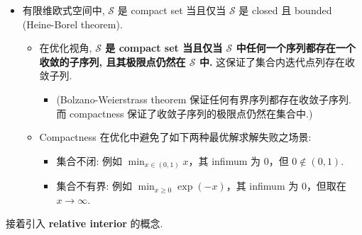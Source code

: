 \begin{itemize}
\item {}有限维欧式空间中, $\mathcal{S}$ 是 compact set 当且仅当 $\mathcal{S}$ 是 closed 且 bounded (Heine-Borel theorem).

\begin{itemize}
\item {}在优化视角, \textbf{$\mathcal{S}$ 是 compact set 当且仅当 $\mathcal{S}$ 中任何一个序列都存在一个收敛的子序列, 且其极限点仍然在 $\mathcal{S}$ 中.} 这保证了集合内迭代点列存在收敛子列.

\begin{itemize}
\item {}(Bolzano-Weierstrass theorem 保证任何有界序列都存在收敛子序列. 而 compactness 保证了收敛子序列的极限点仍然在集合中.)


\end{itemize}


\item {}Compactness 在优化中避免了如下两种最优解求解失败之场景:

\begin{itemize}
\item {}集合不闭: 例如 $\min_{x \in (0,1)} x$，其 infimum 为 $0$，但 $0 \notin (0,1)$.


\item {}集合不有界: 例如 $\min_{x \geq 0} \exp(-x)$，其 infimum 为 $0$，但取在 $x \to \infty$.


\end{itemize}


\end{itemize}


\end{itemize}

接着引入 \textbf{relative interior} 的概念.


